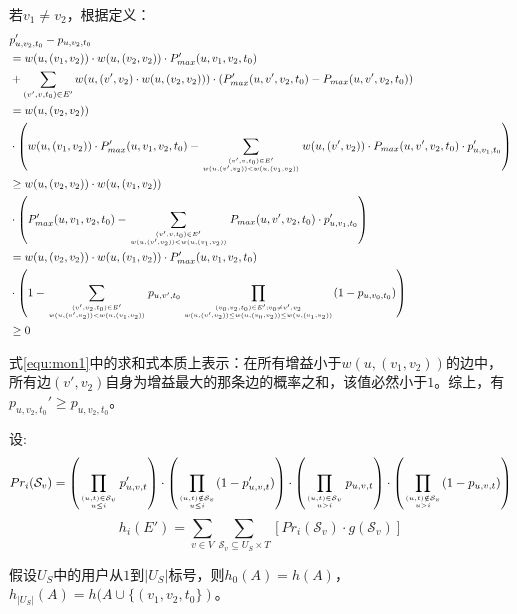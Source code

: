 若$v_1 \ne v_2$，根据定义：
\begin{align}
\small
    &p_{u,v_2,t_0}'-p_{u,v_2,t_0}\\
    &= w(u,(v_1,v_2))\cdot w(u,(v_2,v_2)) \cdot P_{max}'(u,v_1,v_2,t_0) \\
    &+ \sum_{(v',v,t_0)\in E'}w(u,(v',v_2)\cdot w(u,(v_2,v_2))) \cdot(P_{max}'(u,v',v_2,t_0)-P_{max}(u,v',v_2,t_0)) \\ 
    &= w(u,(v_2,v_2)) \\ &\cdot \left(w(u,(v_1,v_2)) \cdot P_{max}'(u,v_1,v_2,t_0)-\sum_{(v',v,t_0)\in E' \atop w(u,(v',v_2))<w(u,(v_1,v_2))} w(u,(v',v_2))\cdot P_{max}(u,v',v_2,t_0)\cdot p_{u,v_1,t_0}' \right) \\ 
    &\ge w(u,(v_2,v_2))\cdot w(u,(v_1,v_2)) \\ & \cdot  \left(P_{max}'(u,v_1,v_2,t_0)-\sum_{(v',v,t_0)\in E'\atop w(u,(v',v_2))<w(u,(v_1,v_2))}P_{max}(u,v',v_2,t_0)\cdot p_{u,v_1,t_0}'\right) \\ 
    &= w(u,(v_2,v_2))\cdot w(u,(v_1,v_2)) \cdot P_{max}'(u,v_1,v_2,t_0) \\& \cdot \left(1-\sum_{(v',v_2,t_0)\in E' \atop w(u,(v',v_2))<w(u,(v_1,v_2))}p_{u,v',t_0}\prod_{(v_0,v_2,t_0)\in E' ; v_0 \ne v',v_2 \atop w(u,(v',v_2))\le w(u,(v_0,v_2)) \le w(u,(v_1,v_2))}(1-p_{u,v_0,t_0})\right)\label{equ:mon1} \\
    &\ge 0
\end{align}

式\ref{equ:mon1}中的求和式本质上表示：在所有增益小于$w(u,(v_1,v_2))$的边中，所有边$(v',v_2)$自身为增益最大的那条边的概率之和，该值必然小于$1$。综上，有$p_{u,v_2,t_0}'\ge p_{u,v_2,t_0}$。

设:
\begin{equation}
Pr_i(\mathcal{S}_v) = \left(\prod_{(u,t)\in \mathcal{S}_v \atop u \le i}p_{u,v,t}'\right)\cdot \left(\prod_{(u,t) \notin \mathcal{S}_v \atop u\le i} (1-p_{u,v,t}')\right)\cdot \left(\prod_{(u,t)\in \mathcal{S}_v \atop u > i}p_{u,v,t}\right)\cdot \left(\prod_{(u,t) \notin \mathcal{S}_v \atop u > i} (1-p_{u,v,t})\right)
\end{equation}
\begin{equation}
h_i(E')= \sum_{v\in V} \sum_{\mathcal{S}_v \subseteq U_S \times T} \left[Pr_i(\mathcal{S}_v)\cdot g(\mathcal{S}_v)\right]
\end{equation}

假设$U_S$中的用户从$1$到$|U_S|$标号，则$h_0(A)=h(A)$，$h_{|U_S|}(A)=h(A\cup\{(v_1,v_2,t_0\})$。

